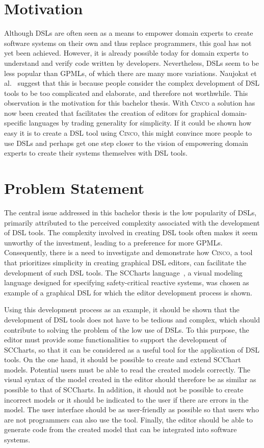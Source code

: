 \section{Motivation}
Although DSLs are often seen as a means to empower domain experts to create software systems on their own and thus replace programmers, this goal has not yet been achieved. However, it is already possible today for domain experts to understand and verify code written by developers. Nevertheless, DSLs seem to be less popular than GPMLs, of which there are many more variations. Naujokat et al.~\cite{Lybecait.2018} suggest that this is because people consider the complex development of DSL tools to be too complicated and elaborate, and therefore not worthwhile. This observation is the motivation for this bachelor thesis. With \textsc{Cinco} a solution has now been created that facilitates the creation of editors for graphical domain-specific languages by trading generality for simplicity. If it could be shown how easy it is to create a DSL tool using \textsc{Cinco}, this might convince more people to use DSLs and perhaps get one step closer to the vision of empowering domain experts to create their systems themselves with DSL tools.

\section{Problem Statement}
The central issue addressed in this bachelor thesis is the low popularity of DSLs, primarily attributed to the perceived complexity associated with the development of DSL tools. The complexity involved in creating DSL tools often makes it seem unworthy of the investment, leading to a preference for more GPMLs. Consequently, there is a need to investigate and demonstrate how \textsc{Cinco}, a tool that prioritizes simplicity in creating graphical DSL editors, can facilitate the development of such DSL tools. The SCCharts language~\cite{Hanxleden.2014}, a visual modeling language designed for specifying safety-critical reactive systems, was chosen as example of a graphical DSL for which the editor development process is shown.

Using this development process as an example, it should be shown that the development of DSL tools does not have to be tedious and complex, which should contribute to solving the problem of the low use of DSLs. To this purpose, the editor must provide some functionalities to support the development of SCCharts, so that it can be considered as a useful tool for the application of DSL tools. On the one hand, it should be possible to create and extend SCChart models. Potential users must be able to read the created models correctly. The visual syntax of the model created in the editor should therefore be as similar as possible to that of SCCharts. In addition, it should not be possible to create incorrect models or it should be indicated to the user if there are errors in the model. The user interface should be as user-friendly as possible so that users who are not programmers can also use the tool. Finally, the editor should be able to generate code from the created model that can be integrated into software systems. 


